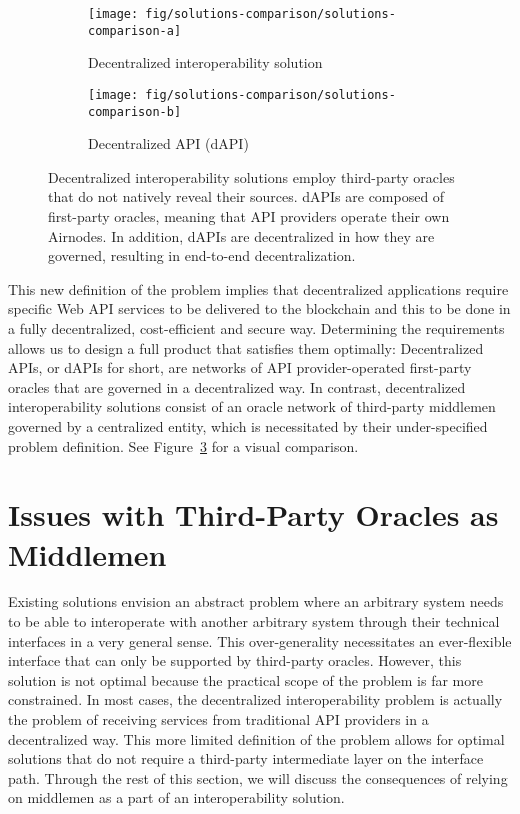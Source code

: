 \documentclass[11pt]{article}
\begin{document}
\begin{figure}
     \centering
     \begin{subfigure}{0.49\textwidth}
        \centering
         \texttt{[image: fig/solutions-comparison/solutions-comparison-a]}
         \caption{Decentralized interoperability solution}
         \label{fig:solutions-comparison-3rd}
     \end{subfigure}
     \hfill
     \begin{subfigure}{0.49\textwidth}
        \centering
         \texttt{[image: fig/solutions-comparison/solutions-comparison-b]}
         \caption{Decentralized API (dAPI)}
         \label{fig:solutions-comparison-1st}
     \end{subfigure}
     \caption{Decentralized interoperability solutions employ third-party oracles that do not natively reveal their sources.
     dAPIs are composed of first-party oracles, meaning that API providers operate their own Airnodes.
     In addition, dAPIs are decentralized in how they are governed, resulting in end-to-end decentralization.}
    \label{fig:solutions-comparison}
\end{figure}

This new definition of the problem implies that decentralized applications require specific Web API services to be delivered to the blockchain and this to be done in a fully decentralized, cost-efficient and secure way.
Determining the requirements allows us to design a full product that satisfies them optimally:
Decentralized APIs, or dAPIs for short, are networks of API provider-operated first-party oracles that are governed in a decentralized way.
In contrast, decentralized interoperability solutions consist of an oracle network of third-party middlemen governed by a centralized entity, which is necessitated by their under-specified problem definition.
See Figure~\ref{fig:solutions-comparison} for a visual comparison.

\section{Issues with Third-Party Oracles as Middlemen}
\label{sec:issues-with-third-party-oracles-as-middlemen}

Existing solutions envision an abstract problem where an arbitrary system needs to be able to interoperate with another arbitrary system through their technical interfaces in a very general sense.
This over-generality necessitates an ever-flexible interface that can only be supported by third-party oracles.
However, this solution is not optimal because the practical scope of the problem is far more constrained.
In most cases, the decentralized interoperability problem is actually the problem of receiving services from traditional API providers in a decentralized way.
This more limited definition of the problem allows for optimal solutions that do not require a third-party intermediate layer on the interface path.
Through the rest of this section, we will discuss the consequences of relying on middlemen as a part of an interoperability solution.
\end{document}
